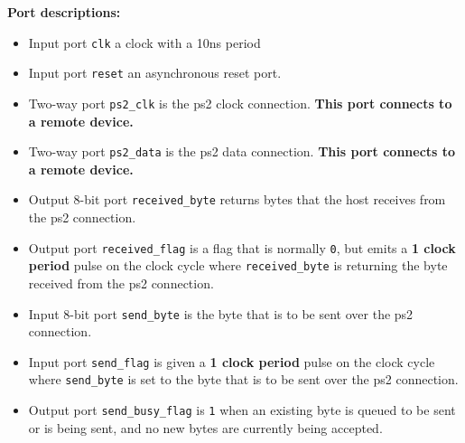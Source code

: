 \documentclass{article}
\begin{document}
{\bf Port descriptions:}
\begin{itemize}
\item Input port \texttt{clk} a clock with a 10ns period
\item Input port \texttt{reset} an asynchronous reset port.  
\item Two-way port \texttt{ps2\_clk} is the ps2 clock connection. {\bf This port connects to a remote device.} 
\item Two-way port \texttt{ps2\_data} is the ps2 data connection. {\bf This port connects to a remote device.} 
\item Output \(8\)-bit port \texttt{received\_byte} returns bytes that the host receives from the ps2 connection. 
\item Output port \texttt{received\_flag} is a flag that is normally \texttt{0}, but emits a {\bf 1 clock period} pulse on the clock cycle where \texttt{received\_byte} is returning the byte received from the ps2 connection. 
\item Input \(8\)-bit port \texttt{send\_byte} is the byte that is to be sent over the ps2 connection. 
\item Input port \texttt{send\_flag} is given a {\bf 1 clock period} pulse on the clock cycle where \texttt{send\_byte} is set to the byte that is to be sent over the ps2 connection. 
\item Output port \texttt{send\_busy\_flag} is \texttt{1} when an existing byte is queued to be sent or is being sent, and no new bytes are currently being accepted.         
\end{itemize}
\end{document}
